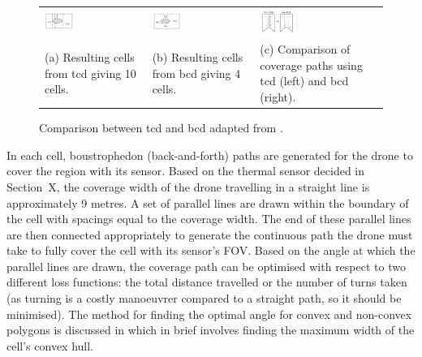 \begin{figure}[h!]
    \centering
    \begin{tabular}{p{}p{}p{}}
        \includegraphics[width=0.3\textwidth]{figs/Jihwan/choset_tcd.pdf} &
        \includegraphics[width=0.3\textwidth]{figs/Jihwan/choset_bcd.pdf} &
        \includegraphics[width=0.3\textwidth]{figs/Jihwan/choset_bcd_tcd_comparison.pdf} \\
        \centering (a) Resulting cells from \gls{tcd} giving 10 cells. & 
        \centering (b) Resulting cells from \gls{bcd} giving 4 cells. & 
        \centering (c) Comparison of coverage paths using \gls{tcd} (left) and \gls{bcd} (right).
    \end{tabular}
    \caption[Comparison between TCD and BCD]
    {Comparison between \gls{tcd} and \gls{bcd} adapted from \cite{choset1998bcd}.}
    \label{fig:msp_choset}
\end{figure}

In each cell, boustrophedon (back-and-forth) paths are generated for the drone to cover the region with its sensor. Based on the thermal sensor decided in Section~X, the coverage width of the drone travelling in a straight line is approximately 9 metres. A set of parallel lines are drawn within the boundary of the cell with spacings equal to the coverage width. The end of these parallel lines are then connected appropriately to generate the continuous path the drone must take to fully cover the cell with its sensor's FOV. Based on the angle at which the parallel lines are drawn, the coverage path can be optimised with respect to two different loss functions: the total distance travelled or the number of turns taken (as turning is a costly manoeuvrer compared to a straight path, so it should be minimised). The method for finding the optimal angle for convex and non-convex polygons is discussed in \cite{torres2016cpp} which in brief involves finding the maximum width of the cell's convex hull. 

